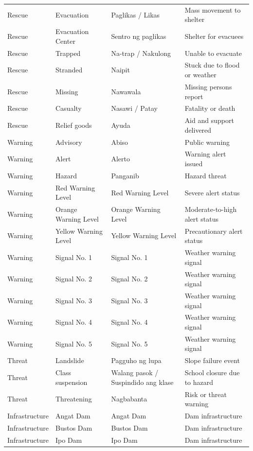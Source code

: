 \documentclass[12pt,a4paper]{report}
\begin{document}
\begin{longtable}{@{}p{} p{} p{} p{}@{}}
	Rescue & Evacuation & Paglikas / Likas & Mass movement to shelter \\
	Rescue & Evacuation Center & Sentro ng paglikas & Shelter for evacuees \\
	Rescue & Trapped & Na-trap / Nakulong & Unable to evacuate \\
	Rescue & Stranded & Naipit & Stuck due to flood or weather \\
	Rescue & Missing & Nawawala & Missing persons report \\
	Rescue & Casualty & Nasawi / Patay & Fatality or death \\
	Rescue & Relief goods & Ayuda & Aid and support delivered \\
	Warning & Advisory & Abiso & Public warning \\
	Warning & Alert & Alerto & Warning alert issued \\
	Warning & Hazard & Panganib & Hazard threat \\
	Warning & Red Warning Level & Red Warning Level & Severe alert status \\
	Warning & Orange Warning Level & Orange Warning Level & Moderate-to-high alert status \\
	Warning & Yellow Warning Level & Yellow Warning Level & Precautionary alert status \\
	Warning & Signal No. 1 & Signal No. 1 & Weather warning signal \\
	Warning & Signal No. 2 & Signal No. 2 & Weather warning signal \\
	Warning & Signal No. 3 & Signal No. 3 & Weather warning signal \\
	Warning & Signal No. 4 & Signal No. 4 & Weather warning signal \\
	Warning & Signal No. 5 & Signal No. 5 & Weather warning signal \\
	Threat & Landslide & Pagguho ng lupa & Slope failure event \\
	Threat & Class suspension & Walang pasok / Suspindido ang klase & School closure due to hazard \\
	Threat & Threatening & Nagbabanta & Risk or threat warning \\
	Infrastructure & Angat Dam & Angat Dam & Dam infrastructure \\
	Infrastructure & Bustos Dam & Bustos Dam & Dam infrastructure \\
	Infrastructure & Ipo Dam & Ipo Dam & Dam infrastructure \\
\end{longtable}
\end{document}
